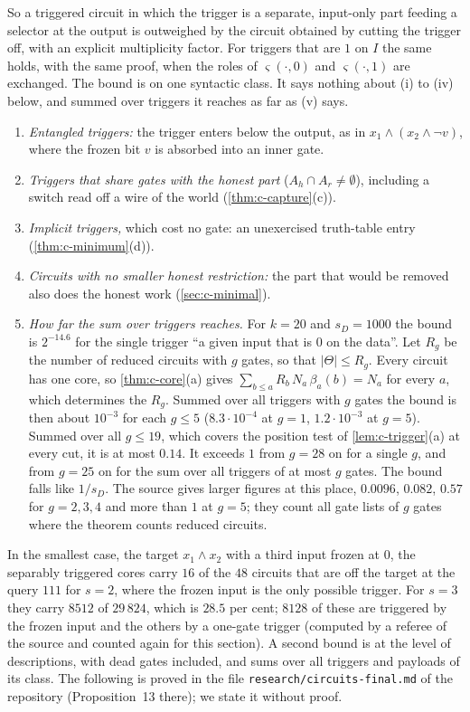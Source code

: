 So a triggered circuit in which the trigger is a separate, input-only part feeding a selector at the output is
outweighed by the circuit obtained by cutting the trigger off, with an explicit multiplicity factor. For
triggers that are $1$ on $I$ the same holds, with the same proof, when the roles of $\varsigma(\cdot,0)$ and
$\varsigma(\cdot,1)$ are exchanged. The bound is on one syntactic class. It says nothing about (i) to (iv)
below, and summed over triggers it reaches as far as (v) says.
\begin{enumerate}[label=(\roman*),leftmargin=2em,itemsep=0pt,topsep=2pt]
\item \emph{Entangled triggers:} the trigger enters below the output, as in $x_1\wedge(x_2\wedge\neg v)$,
where the frozen bit $v$ is absorbed into an inner gate.
\item \emph{Triggers that share gates with the honest part} ($A_h\cap A_r\ne\emptyset$), including a switch
read off a wire of the world (\cref{thm:c-capture}(c)).
\item \emph{Implicit triggers,} which cost no gate: an unexercised truth-table entry
(\cref{thm:c-minimum}(d)).
\item \emph{Circuits with no smaller honest restriction:} the part that would be removed also does the honest
work (\cref{sec:c-minimal}).
\item \emph{How far the sum over triggers reaches.} For $k=20$ and $s_D=1000$ the bound is $2^{-14.6}$ for
the single
trigger ``a given input that is $0$ on the data''. Let $R_g$ be the number of reduced circuits with $g$ gates,
so that $|\Theta|\le R_g$. Every circuit has one core, so \cref{thm:c-core}(a) gives
$\sum_{b\le a}R_b\,N_a\,\beta_a(b)=N_a$ for every $a$, which determines the $R_g$. Summed over all triggers
with $g$ gates the bound is then about $10^{-3}$ for each $g\le5$ ($8.3\cdot10^{-4}$ at $g=1$,
$1.2\cdot10^{-3}$ at $g=5$). Summed over all $g\le19$, which covers the position test of
\cref{lem:c-trigger}(a) at every cut, it is at most $0.14$. It exceeds $1$ from $g=28$ on for a single $g$,
and from $g=25$ on for the sum over all triggers of at most $g$ gates. The bound falls like $1/s_D$. The
source gives larger figures at this place, $0.0096$, $0.082$, $0.57$ for $g=2,3,4$ and more than $1$ at $g=5$;
they count all gate lists of $g$ gates where the theorem counts reduced circuits.
\end{enumerate}
In the smallest case, the target $x_1\wedge x_2$ with a third input frozen at $0$, the separably triggered
cores carry $16$ of the $48$ circuits that are off the target at the query $111$ for $s=2$, where the frozen
input is the only possible trigger. For $s=3$ they carry $8512$ of $29\,824$, which is $28.5$ per cent; $8128$
of these are triggered by the frozen input and the others by a one-gate trigger (computed by a referee of the
source and counted again for this section). A second bound is at the level of descriptions, with dead gates
included, and sums over all triggers and payloads of its class. The following is proved in the file
\texttt{research/circuits-final.md} of the repository (Proposition~13 there); we state it without proof.


